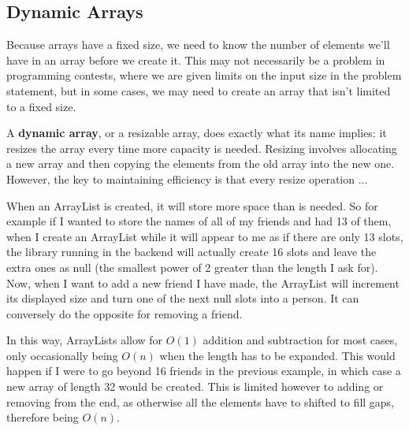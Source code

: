 
\subsection{Dynamic Arrays}

Because arrays have a fixed size, we need to know the number of elements we'll have in an array before we create it. This may not necessarily be a problem in programming contests, where we are given limits on the input size in the problem statement, but in some cases, we may need to create an array that isn't limited to a fixed size.

A \textbf{dynamic array}, or a resizable array, does exactly what its name implies: it resizes the array every time more capacity is needed. Resizing involves allocating a new array and then copying the elements from the old array into the new one. However, the key to maintaining efficiency is that every resize operation ...

When an ArrayList is created, it will store more space than is needed. So for example if I wanted to store the names of all of my friends and had 13 of them, when I create an ArrayList while it will appear to me as if there are only 13 slots, the library running in the backend will actually create 16 slots and leave the extra ones as null (the smallest power of 2 greater than the length I ask for). Now, when I want to add a new friend I have made, the ArrayList will increment its displayed size and turn one of the next null slots into a person. It can conversely do the opposite for removing a friend.

In this way, ArrayLists allow for $O(1)$ addition and subtraction for most cases, only occasionally being $O(n)$ when the length has to be expanded. This would happen if I were to go beyond 16 friends in the previous example, in which case a new array of length 32 would be created. This is limited however to adding or removing from the end, as otherwise all the elements have to shifted to fill gaps, therefore being $O(n)$.


